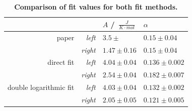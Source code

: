 \documentclass{include/thesisclass3}
\newcommand{\cc}{\cdot}
\newcommand{\e}[1]{\,\si{#1}}
\begin{document}
\begin{table}[H]
\centering
\caption{\label{neeltable}\textbf{Comparison of fit values for both fit methods.}}
\begin{tabular}{rr|ll}
 	& 	&$A$ / $\e{\frac{J}{K \cc mol}}$ & $\alpha$ \\
\midrule
paper & \textit{left}  &$3.5 \pm  $&$0.15 \pm 0.04$\\
 & \textit{right}  &$1.47 \pm 0.16$&$0.15 \pm 0.04$ \\
\midrule
direct fit & \textit{left} &$4.04 \pm 0.04$&$0.136 \pm 0.002$\\
 & \textit{right} & $2.54 \pm 0.04$&$0.182 \pm 0.007$ \\
\midrule
double logarithmic fit & \textit{left} & $4.03 \pm 0.04$ & $0.132 \pm 0.002$\\
 & \textit{right} & $2.05 \pm 0.05$ & $0.121 \pm 0.005$\\
\midrule
\end{tabular}
\end{table}
\end{document}
